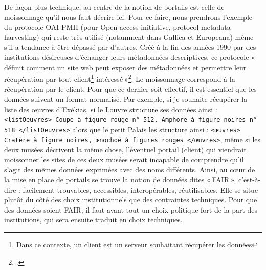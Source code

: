De façon plus technique, au centre de la notion de portails est celle de moissonnage qu’il nous faut décrire ici. Pour ce faire, nous prendrons l’exemple du protocole OAI-PMH (pour Open access initiative, protocol metadata harvesting) qui reste très utilisé (notamment dans Gallica et Europeana) même s’il a tendance à être dépassé par d’autres. Créé à la fin des années 1990 par des institutions désireuses d’échanger leurs métadonnées descriptives, ce protocole « définit comment un site web peut exposer des métadonnées et permettre leur récupération par tout client\footnote{Dans ce contexte, un client est un serveur souhaitant récupérer les données} intéressé »\footcite[§ 22]{mesguich_5_2017}. Le moissonnage correspond à la récupération par le client. Pour que ce dernier soit effectif, il est essentiel que les données suivent un format normalisé. Par exemple, si je souhaite récupérer la liste des œuvres d’Exékias, si le Louvre structure ses données ainsi : \texttt{<listOeuvres> Coupe à figure rouge n° 512, Amphore à figure noires n° 518 </listOeuvres>} alors que le petit Palais les structure ainsi : \texttt{<œuvres> Cratère à figure noires, œnochoé à figures rouges </œuvres>}, même si les deux musées décrivent la même chose, l’éventuel portail (client) qui viendrait moissonner les sites de ces deux musées serait incapable de comprendre qu’il s’agit des mêmes données exprimées avec des noms différents. Ainsi, au cœur de la mise en place de portails se trouve la notion de données dites « FAIR », c’est-à-dire : facilement trouvables, accessibles, interopérables, réutilisables. Elle se situe plutôt du côté des choix institutionnels que des contraintes techniques. Pour que des données soient FAIR, il faut avant tout un choix politique fort de la part des institutions, qui sera ensuite traduit en choix techniques.

